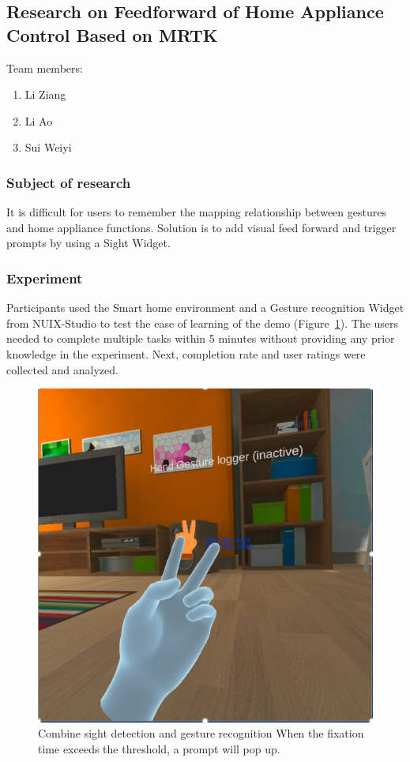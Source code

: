 \subsection{Research on Feedforward of Home Appliance Control Based on MRTK}

Team members:
\begin{enumerate}
    \item Li Ziang
    \item Li Ao
    \item Sui Weiyi
\end{enumerate}

\subsubsection{Subject of research}

It is difficult for users to remember the mapping relationship between gestures and home appliance functions.
Solution is to add visual feed forward and trigger prompts by using a Sight Widget.

\subsubsection{Experiment}

Participants used the Smart home environment and a Gesture recognition Widget from NUIX-Studio to test the ease of learning of the demo (Figure~\ref{fig:Project7-figure}). The users needed to complete multiple tasks within 5 minutes without providing any prior knowledge in the experiment.
Next, completion rate and user ratings were collected and analyzed.

\begin{figure}
  \centering
  \includegraphics[width=0.9\linewidth]{figures/Project_7.png}
  \caption{Combine sight detection and gesture recognition
When the fixation time exceeds the threshold, a prompt will pop up.}
  \label{fig:Project7-figure}
\end{figure}

